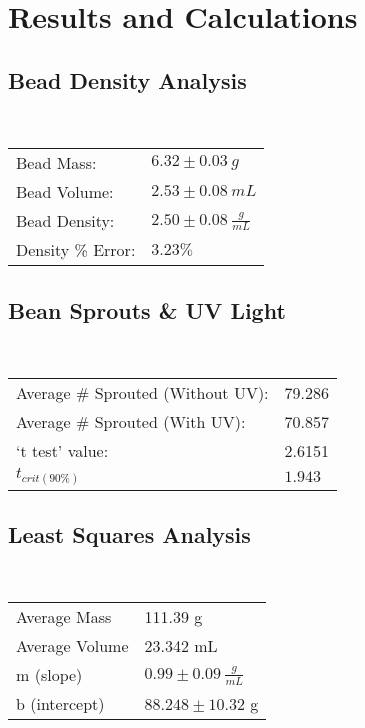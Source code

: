 \documentclass{article}
\begin{document}
\newpage
\section{Results and Calculations}
\subsection{Bead Density Analysis} \mbox{}\\
    \begin{tabularx}{450pt}{|X | X |}
        \hline
        Bead Mass: & $6.32 \pm 0.03\ g$\\
        Bead Volume: & $2.53 \pm 0.08\ mL$\\
        Bead Density: & $2.50 \pm 0.08\ \frac{g}{mL}$ \\
        Density \% Error: & $3.23 \%$ \\
        \hline
    \end{tabularx}
\subsection{Bean Sprouts \& UV Light} \mbox{}\\
    \begin{tabularx}{450pt}{|X | X |}
        \hline
        Average \# Sprouted (Without UV): & 79.286\\
        Average \# Sprouted (With UV): & 70.857\\
        `t test' value: & 2.6151\\
        $t_{crit (90\%)}$ & $1.943$ \\
        \hline
    \end{tabularx}
\subsection{Least Squares Analysis} \mbox{}\\
    \begin{tabularx}{450pt}{|X | X |}
        \hline
        Average Mass & 111.39 g \\
        Average Volume & 23.342 mL \\
        m (slope) & $0.99 \pm 0.09\ \frac{g}{mL}$ \\
        b (intercept) & $88.248 \pm 10.32$ g \\
        \hline
    \end{tabularx}
\end{document}
